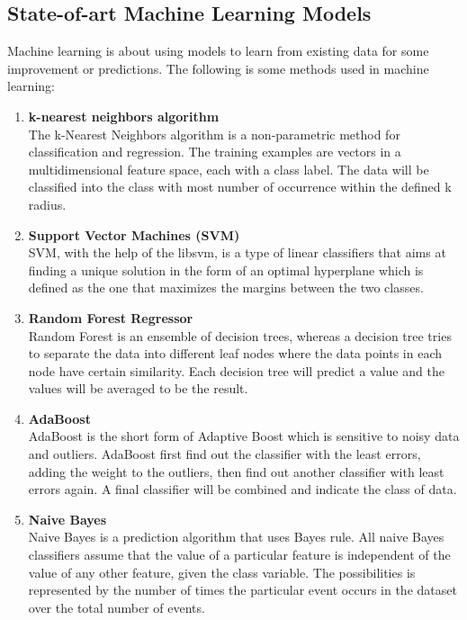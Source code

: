 \documentclass{article}
\begin{document}
	\subsection{State-of-art Machine Learning Models}
	Machine learning is about using models to learn from existing data for some improvement or predictions. 
	The following is some methods used in machine learning:
	\begin{enumerate}
		\item \textbf{k-nearest neighbors algorithm} \\
		The k-Nearest Neighbors algorithm is a non-parametric method for classification and regression. 
		The training examples are vectors in a multidimensional feature space, each with a class label. 
		The data will be classified into the class with most number of occurrence within the defined k radius.
	
		\item \textbf{Support Vector Machines (SVM)} \\
		SVM, with the help of the libsvm, is a type of linear classiﬁers that aims at ﬁnding 
		a unique solution in the form of an optimal hyperplane which is deﬁned as the one that maximizes the margins between the two classes.

		\item \textbf{Random Forest Regressor} \\
		Random Forest is an ensemble of decision trees, whereas a decision tree tries to separate the data into different leaf nodes 
		where the data points in each node have certain similarity. Each decision tree will predict a value and the values will be averaged to be the result.
	
		\item \textbf{AdaBoost} \\
		AdaBoost is the short form of Adaptive Boost which is sensitive to noisy data and outliers. 
		AdaBoost first find out the classifier with the least errors, adding the weight to the outliers, then find out another classifier with least errors again.
		A final classifier will be combined and indicate the class of data.
	
		\item \textbf{Naive Bayes} \\ 
		Naive Bayes is a prediction algorithm that uses Bayes rule. 
		All naive Bayes classifiers assume that the value of a particular feature is independent of the value of any other feature, given the class variable. 
		The possibilities is represented by the number of times the particular event occurs in the dataset over the total number of events. 
	\end{enumerate}
\end{document}
